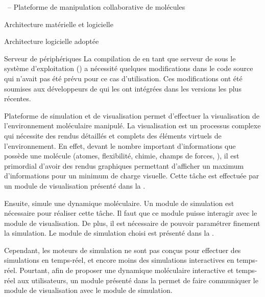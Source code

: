 \documentclass[myfrancais,ngerman,english,frenchb]{mythesis}
\begin{document}
\begin{mychapter}{\myShaddock\ -- Plateforme de manipulation collaborative de molécules}
\begin{mysection}{Architecture matérielle et logicielle}
\begin{mysubsection}{Architecture logicielle adoptée}
\begin{mysubsubsection}{Serveur de périphériques}
					La compilation de  en tant que serveur de \myOmni sous le système d'exploitation \myLinux (\myUbuntu) a nécessité quelques modifications dans le code source qui n'avait pas été prévu pour ce cas d'utilisation.
					Ces modifications ont été soumises aux développeurs de  qui les ont intégrées dans les versions les plus récentes.
				\end{mysubsubsection}
			\end{mysubsection}
		\end{mysection}
		\begin{mysection}{Plateforme de simulation et de visualisation}
			\myShaddock permet d'effectuer la visualisation de l'environnement moléculaire manipulé.
			La visualisation est un processus complexe qui nécessite des rendus détaillés et complets des éléments virtuels de l'environnement.
			En effet, devant le nombre important d'informations que possède une molécule (atomes, flexibilité, chimie, champs de forces, \myetc), il est primordial d'avoir des rendus graphiques permettant d'afficher un maximum d'informations pour un minimum de charge visuelle.
			Cette tâche est effectuée par un module de visualisation présenté dans la .

			Ensuite, \myShaddock simule une dynamique moléculaire.
			Un module de simulation est nécessaire pour réaliser cette tâche.
			Il faut que ce module puisse interagir avec le module de visualisation.
			De plus, il est nécessaire de pouvoir paramétrer finement la simulation.
			Le module de simulation choisi est présenté dans la .

			Cependant, les moteurs de simulation ne sont pas conçus pour effectuer des simulations en temps-réel, et encore moins des simulations interactives en temps-réel.
			Pourtant, afin de proposer une dynamique moléculaire interactive et temps-réel aux utilisateurs, un module présenté dans la  permet de faire communiquer le module de visualisation avec le module de simulation.


\end{mysection}
\end{mychapter}
\end{document}
